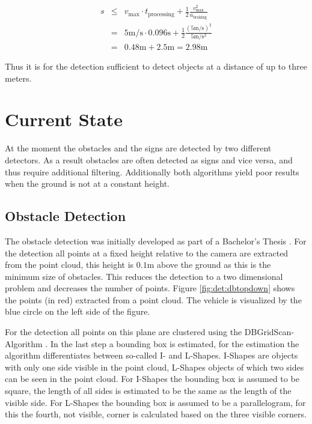 \begin{eqnarray}
    s &\leq& v_\text{max} \cdot t_\text{processing} + \frac{1}{2} \frac{v_\text{max}^2}{a_\text{braking}} \\
    &=& 5 \si{\m \per \s} \cdot 0.096 \si{\s} 
        + \frac{1}{2} \frac{{(5\si{\m \per \s})}^2}{5 \si{\m \per \square \s}} \nonumber \\
    &=& 0.48 \si{\m} + 2.5 \si{\m} = 2.98 \si{\m} \nonumber
\end{eqnarray}

Thus it is for the detection sufficient to detect objects at a distance of up to three meters. 

\section{Current State}
At the moment the obstacles and the signs are detected by two different detectors. As a result obstacles are often detected as signs and vice versa, and thus require additional filtering. Additionally both algorithms yield poor results when the ground is not at a constant height.

\subsection{Obstacle Detection} \label{sec:det:obstDet}
The obstacle detection was initially developed as part of a Bachelor's Thesis \cite{marceldebout2012}.
For the detection all points at a fixed height relative to the camera are extracted from the point cloud, this height is $0.1\si{\m}$ above the ground as this is the minimum size of obstacles. This reduces the detection to a two dimensional problem and decreases the number of points.
Figure \ref{fig:det:dbtopdown} shows the points (in red) extracted from a point cloud. The vehicle is visualized by the blue circle on the left side of the figure.

For the detection all points on this plane are clustered using the DBGridScan-Algorithm \cite{danielmeisner2016}. 
In the last step a bounding box is estimated, for the estimation the algorithm differentiates between so-called I- and L-Shapes. 
I-Shapes are objects with only one side visible in the point cloud, L-Shapes objects of which two sides can be seen in the point cloud.
For I-Shapes the bounding box is assumed to be square, the length of all sides is estimated to be the same as the length of the visible side. 
For L-Shapes the bounding box is assumed to be a parallelogram, for this the fourth, not visible, corner is calculated based on the three visible corners.

